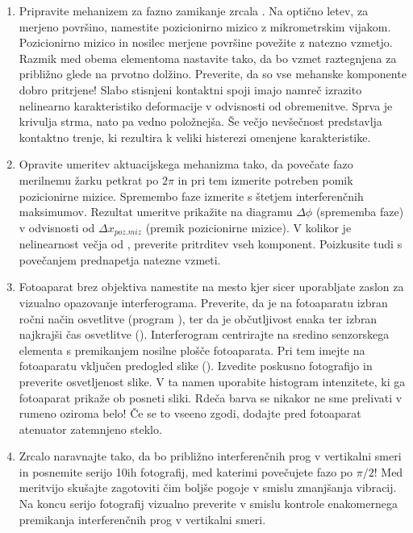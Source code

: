 \documentclass[letterpaper,10pt,english]{sphinxmanual}
\begin{document}
\begin{enumerate}
\begin{itemize}
\end{itemize}

\item {} 
\sphinxAtStartPar
Pripravite mehanizem za fazno zamikanje zrcala . Na optično letev, za merjeno površino, namestite pozicionirno mizico z mikrometrskim vijakom. Pozicionirno mizico in nosilec merjene površine povežite z natezno vzmetjo. Razmik med obema elementoma nastavite tako, da bo vzmet raztegnjena za približno  glede na prvotno dolžino. Preverite, da so vse mehanske komponente dobro pritrjene! Slabo stisnjeni kontaktni spoji imajo namreč izrazito nelinearno karakteristiko deformacije v odvisnosti od obremenitve. Sprva je krivulja strma, nato pa vedno položnejša. Še večjo nevšečnost predstavlja kontaktno trenje, ki rezultira k veliki histerezi omenjene karakteristike.

\item {} 
\sphinxAtStartPar
Opravite umeritev aktuacijskega mehanizma tako, da povečate fazo merilnemu žarku petkrat po \({2\pi}\) in pri tem izmerite potreben pomik pozicionirne mizice. Spremembo faze izmerite s štetjem interferenčnih maksimumov. Rezultat umeritve prikažite na diagramu \({\Delta\phi}\) (sprememba faze) v odvisnosti od \({\Delta x_{poz.miz}}\) (premik pozicionirne mizice). V kolikor je nelinearnost večja od , preverite pritrditev vseh komponent. Poizkusite tudi s povečanjem prednapetja natezne vzmeti.

\item {} 
\sphinxAtStartPar
Fotoaparat brez objektiva namestite na mesto kjer sicer uporabljate zaslon za vizualno opazovanje interferograma. Preverite, da je na fotoaparatu izbran ročni način osvetlitve (program ), ter da je občutljivost  enaka  ter izbran najkrajši čas osvetlitve (). Interferogram centrirajte na sredino senzorskega elementa s premikanjem nosilne plošče fotoaparata. Pri tem imejte na fotoaparatu vključen predogled slike (). Izvedite poskusno fotografijo in preverite osvetljenost slike. V ta namen uporabite histogram intenzitete, ki ga fotoaparat prikaže ob posneti sliki. Rdeča barva se nikakor ne sme prelivati v rumeno oziroma belo! Če se to vseeno zgodi, dodajte pred fotoaparat atenuator \textendash{} zatemnjeno steklo.

\item {} 
\sphinxAtStartPar
Zrcalo  naravnajte tako, da bo približno  interferenčnih prog v vertikalni smeri in posnemite serijo 10\sphinxhyphen{}ih fotografij, med katerimi povečujete fazo po \({\pi/2}\)! Med meritvijo skušajte zagotoviti čim boljše pogoje v smislu zmanjšanja vibracij. Na koncu serijo fotografij vizualno preverite v smislu kontrole enakomernega premikanja interferenčnih prog v vertikalni smeri.

\end{enumerate}
\end{document}
